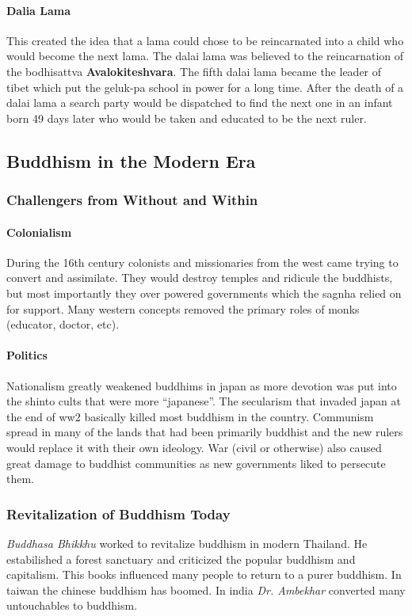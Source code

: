\documentclass{article}
\begin{document}
\paragraph{Dalia Lama}
\label{par:dalia_lama}
This created the idea that a lama could chose to be reincarnated into a child who would become the next lama. The dalai lama was believed to the reincarnation of the bodhisattva \textbf{Avalokiteshvara}. The fifth dalai lama became the leader of tibet which put the geluk-pa school in power for a long time. After the death of a dalai lama a search party would be dispatched to find the next one in an infant born 49 days later who would be taken and educated to be the next ruler.

\subsection{Buddhism in the Modern Era}
\label{sub:buddhism_in_the_modern_era}

\subsubsection{Challengers from Without and Within}
\label{ssub:challengers_from_without_and_within}
\paragraph{Colonialism}
\label{par:colonialism}
During the 16th century colonists and missionaries from the west came trying to convert and assimilate. They would destroy temples and ridicule the buddhists, but most importantly they over powered governments which the sagnha relied on for support. Many western concepts removed the primary roles of monks (educator, doctor, etc).

\paragraph{Politics}
\label{par:politics}
Nationalism greatly weakened buddhims in japan as more devotion was put into the shinto cults that were more ``japanese''. The secularism that invaded japan at the end of ww2 basically killed most buddhism in the country. Communism spread in many of the lands that had been primarily buddhist and the new rulers would replace it with their own ideology. War (civil or otherwise) also caused great damage to buddhist communities as new governments liked to persecute them.

\subsubsection{Revitalization of Buddhism Today}
\label{ssub:revitalization_of_buddhism_today}
\emph{Buddhasa Bhikkhu} worked to revitalize buddhism in modern Thailand. He estabilished a forest sanctuary and criticized the popular buddhism and capitalism. This books influenced many people to return to a purer buddhism. In taiwan the chinese buddhism has boomed. In india \emph{Dr. Ambekhar} converted many untouchables to buddhism.
\end{document}
